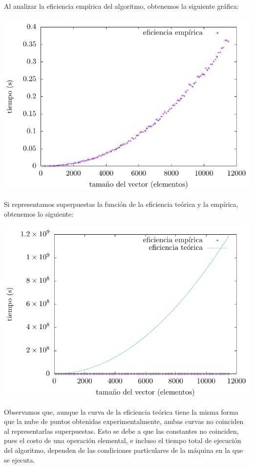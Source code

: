 \documentclass[11pt,a4paper]{article}
\begin{document}

\newpage

Al analizar la eficiencia empírica del algoritmo, obtenemos la siguiente gráfica:\\

\begin{center}
	\includegraphics{img/tiempos_ordenacion.pdf}
\end{center}

Si representamos superpuestas la función de la eficiencia teórica y la empírica, obtenemos lo siguiente:\\

\begin{center}
	\includegraphics{img/tiempos_ordenacion_teorica_superpuesta.pdf}
\end{center}

Observamos que, aunque la curva de la eficiencia teórica tiene la misma forma que la nube de puntos obtenidas experimentalmente, ambas curvas no coinciden al representarlas superpuestas. Esto se debe a que las constantes no coinciden, pues el costo de una operación elemental, e incluso el tiempo total de ejecución del algoritmo, dependen de las condiciones particulares de la máquina en la que se ejecuta.
\end{document}
